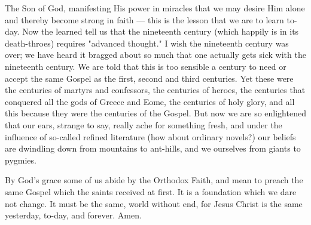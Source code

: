 The Son of God, manifesting His power in 
miracles that we may desire Him alone and 
thereby become strong in faith — this is the lesson
that we are to learn to-day. Now the learned 
tell us that the nineteenth century (which happily
is in its death-throes) requires "advanced 
thought." I wish the nineteenth century was 
over; we have heard it bragged about so much 
that one actually gets sick with the nineteenth 
century. We are told that this is too sensible a 
century to need or accept the same Gospel as the 
first, second and third centuries. Yet these were 
the centuries of martyrs and confessors, the centuries
of heroes, the centuries that conquered all
the gods of Greece and Eome, the centuries of 
holy glory, and all this because they were the 
centuries of the Gospel. But now we are so 
enlightened that our ears, strange to say, really 
ache for something fresh, and under the influence
of so-called refined literature (how about 
ordinary novels?) our beliefs are dwindling 
down from mountains to ant-hills, and we ourselves
from giants to pygmies. 

By God's grace some of us abide by the 
Orthodox Faith, and mean to preach the same 
Gospel which the saints received at first. It is 
a foundation which we dare not change. It must 
be the same, world without end, for Jesus Christ 
is the same yesterday, to-day, and forever. Amen.
